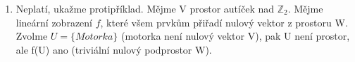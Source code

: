 \documentclass[12pt]{article}
\begin{document}
\begin{enumerate}
\begin{itemize}
        \begin{align*}
          tw = tf(v) = f(tv) \\
          \text{U je prostor také nad T, pak} \quad tv \in U\\
          \Longrightarrow f(tv) \in f(U) \\
          \Longrightarrow tw \in f(U) \\
        \end{align*}
      \end{itemize}
  
      \item Neplatí, ukažme protipříklad. Mějme V prostor autíček nad $\mathbb{Z}_2$. Mějme lineární zobrazení $f$,
      které všem prvkům přiřadí nulový vektor z prostoru W. Zvolme $U=\{Motorka\}$ (motorka není nulový vektor V),
      pak U není prostor, ale f(U) ano (triviální nulový podprostor W).

\end{enumerate}
\end{document}
